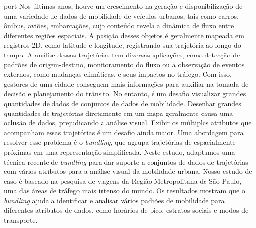 
\begin{resumo}{port}
  Nos últimos anos, houve um crescimento na geração e disponibilização de uma
variedade de dados de mobilidade de veículos urbanos, tais como carros, ônibus,
aviões, embarcações, cujo conteúdo revela a dinâmica de fluxo entre diferentes
regiões espaciais. A posição desses objetos é geralmente mapeada em registros
2D, como latitude e longitude, registrando sua trajetória ao longo do tempo. A
análise dessas trajetórias tem diversas aplicações, como detecção de padrões de
origem-destino, monitoramento do fluxo ou a observação de eventos externos, como
mudanças climáticas, e seus impactos no tráfego. Com isso, gestores de uma
cidade conseguem mais informações para auxiliar na tomada de decisão e
planejamento do trânsito. No entanto, é um desafio visualizar grandes
quantidades de dados de conjuntos de dados de mobilidade. Desenhar grandes
quantidades de trajetórias diretamente em um mapa geralmente causa uma  oclusão
de dados, prejudicando a análise visual. Exibir os múltiplos atributos que
acompanham essas trajetórias é um desafio ainda maior. Uma abordagem para
resolver esse problema é o \emph{bundling}, que agrupa trajetórias de
espacialmente próximas em uma representação simplificada. Neste estudo,
adaptamos uma técnica recente de \emph{bundling} para dar suporte a conjuntos de
dados de trajetórias com vários atributos para a análise visual da mobilidade
urbana. Nosso estudo de caso é baseado na pesquisa de viagens da Região
Metropolitana de São Paulo, uma das áreas de tráfego mais intenso do mundo. Os
resultados mostram que o \emph{bundling} ajuda a identificar e analisar vários
padrões de mobilidade para diferentes atributos de dados, como horários de pico,
estratos sociais e modos de transporte.
\end{resumo}

